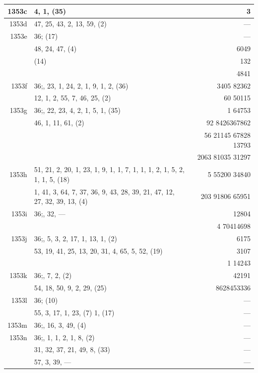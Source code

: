 \documentclass[11pt]{article}
\begin{document}
{\begin{longtable}{|r|p{8.5cm}|r|}
\hline
1353c  & 4, 1, (35) & 3 \\
\hline
1353d  & 47, 25, 43, 2, 13, 59, (2) & --- \\
\hline
1353e  & $36$;\; (17) & --- \\
       & 48, 24, 47, (4) & 6049 \\
       & (14) & 132 \\
       & & 4841 \\
\hline
1353f  & $36$;\; 49, 23, 1, 24, 2, 1, 9, 1, 2, (36) & 3405 82362 \\
       & 12, 1, 2, 55, 7, 46, 25, (2) & 60 50115 \\
\hline
1353g  & $36$;\; 50, 22, 23, 4, 2, 1, 5, 1, (35) & 1 64753 \\
       & 46, 1, 11, 61, (2) & 92 8426367862 \\
       & & 56 21145 67828 13793 \\
       & & 2063 81035 31297 \\
\hline
1353h  & 51, 21, 2, 20, 1, 23, 1, 9, 1, 1, 7, 1, 1, 1, 2, 1, 5, 2, 1, 1, 5, (18) & 5 55200 34840 \\
       & 1, 41, 3, 64, 7, 37, 36, 9, 43, 28, 39, 21, 47, 12, 27, 32, 39, 13, (4) & 203 91806 65951 \\
\hline
1353i  & $36$;\; 52, 32, --- & 12804 \\
       & & 4 70414698 \\
\hline
1353j  & $36$;\; 2, 5, 3, 2, 17, 1, 13, 1, (2) & 6175 \\
       & 53, 19, 41, 25, 13, 20, 31, 4, 65, 5, 52, (19) & 3107 \\
       & & 1 14243 \\
\hline
1353k  & $36$;\; 1, 7, 2, (2) & 42191 \\
       & 54, 18, 50, 9, 2, 29, (25) & 8628453336 \\
\hline
1353l  & $36$;\; (10) & --- \\
       & 55, 3, 17, 1, 23, (7) 1, (17) & --- \\
\hline
1353m  & $36$;\; 56, 16, 3, 49, (4) & --- \\
\hline
1353n  & $36$;\; 1, 1, 1, 2, 1, 8, (2) & --- \\
       & 31, 32, 37, 21, 49, 8, (33) & --- \\
       & 57, 3, 39, --- & --- \\
\hline
\end{longtable}
}
\end{document}
